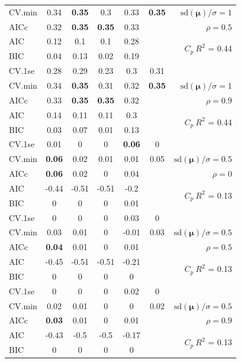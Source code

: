 \documentclass[12pt]{article}
\newcommand{\mr}[1]{\mathrm{#1}}
\newcommand{\bm}[1]{\mathbf{#1}}
\begin{document}
\begin{table}[p]
\begin{center}
\begin{tabular}{l*{5}{c}|r}
CV.min & 0.34 & {\bf 0.35} & 0.3 & 0.33 & {\bf 0.35} &  $\mr{sd}(\bm{\mu})/\sigma=1$ \\
AICc & 0.32 & {\bf 0.35} & {\bf 0.35} & 0.33 & & $\rho=0.5$ \\
AIC & 0.12 & 0.1 & 0.1 & 0.28 & & \multirow{2}{*}{$C_p ~ R^2$ = 0.44} \\
BIC & 0.04 & 0.13 & 0.02 & 0.19 & & \\
 \hline 
CV.1se & 0.28 & 0.29 & 0.23 & 0.3 & 0.31 &\\
CV.min & 0.34 & {\bf 0.35} & 0.31 & 0.32 & {\bf 0.35} &  $\mr{sd}(\bm{\mu})/\sigma=1$ \\
AICc & 0.33 & {\bf 0.35} & {\bf 0.35} & 0.32 & & $\rho=0.9$ \\
AIC & 0.14 & 0.11 & 0.11 & 0.3 & & \multirow{2}{*}{$C_p ~ R^2$ = 0.44} \\
BIC & 0.03 & 0.07 & 0.01 & 0.13 & & \\
 \hline 
CV.1se & 0.01 & 0 & 0 & {\bf 0.06} & 0 &\\
CV.min & {\bf 0.06} & 0.02 & 0.01 & 0.01 & 0.05 &  $\mr{sd}(\bm{\mu})/\sigma=0.5$ \\
AICc & {\bf 0.06} & 0.02 & 0 & 0.04 & & $\rho=0$ \\
AIC & -0.44 & -0.51 & -0.51 & -0.2 & & \multirow{2}{*}{$C_p ~ R^2$ = 0.13} \\
BIC & 0 & 0 & 0 & 0.01 & & \\
 \hline 
CV.1se & 0 & 0 & 0 & 0.03 & 0 &\\
CV.min & 0.03 & 0.01 & 0 & -0.01 & 0.03 &  $\mr{sd}(\bm{\mu})/\sigma=0.5$ \\
AICc & {\bf 0.04} & 0.01 & 0 & 0.01 & & $\rho=0.5$ \\
AIC & -0.45 & -0.51 & -0.51 & -0.21 & & \multirow{2}{*}{$C_p ~ R^2$ = 0.13} \\
BIC & 0 & 0 & 0 & 0 & & \\
 \hline 
CV.1se & 0 & 0 & 0 & 0.02 & 0 &\\
CV.min & 0.02 & 0.01 & 0 & 0 & 0.02 &  $\mr{sd}(\bm{\mu})/\sigma=0.5$ \\
AICc & {\bf 0.03} & 0.01 & 0 & 0.01 & & $\rho=0.9$ \\
AIC & -0.43 & -0.5 & -0.5 & -0.17 & & \multirow{2}{*}{$C_p ~ R^2$ = 0.13} \\
BIC & 0 & 0 & 0 & 0 & & \\
 \hline 
\end{tabular}
\end{center}
\vspace{-1cm}
\end{table}
\end{document}
